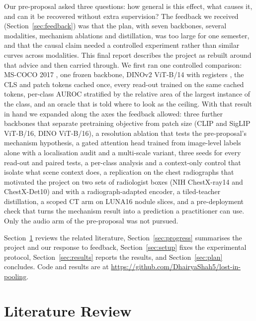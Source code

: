 \documentclass[10pt,letterpaper,twocolumn]{article}
\begin{document}
Our pre-proposal asked three questions: how general is this effect, what causes it, and can it
be recovered without extra supervision? The feedback we received (Section~\ref{sec:feedback})
was that the plan, with seven backbones, several modalities, mechanism ablations and
distillation, was too large for one semester, and that the causal claim needed a controlled
experiment rather than similar curves across modalities. This final report describes the
project as rebuilt around that advice and then carried through. We first ran one controlled
comparison: MS-COCO 2017
\citep{lin2014coco}, one frozen backbone, DINOv2 ViT-B/14 with registers
\citep{oquab2024dinov2,darcet2024registers}, the CLS and patch tokens cached once, every
read-out trained on the same cached tokens, per-class AUROC stratified by the relative area of
the largest instance of the class, and an oracle that is told where to look as the ceiling.
With that result in hand we expanded along the axes the feedback allowed: three further
backbones that separate pretraining objective from patch size (CLIP and SigLIP ViT-B/16, DINO
ViT-B/16), a resolution ablation that tests the pre-proposal's mechanism hypothesis, a gated
attention head trained from image-level labels alone with a localisation audit and a
multi-scale variant, three seeds for every read-out and paired tests, a per-class analysis
and a context-only control that isolate what scene context does, a replication on the chest
radiographs that motivated the project on two sets of radiologist boxes (NIH ChestX-ray14 and
ChestX-Det10) and with a radiograph-adapted encoder, a tiled-teacher distillation, a scoped
CT arm on LUNA16 nodule slices, and a pre-deployment check that turns the mechanism result
into a prediction a practitioner can use. Only the audio arm of the pre-proposal was not
pursued.

Section~\ref{sec:lit} reviews the related literature, Section~\ref{sec:progress} summarises
the project and our response to feedback, Section~\ref{sec:setup} fixes the experimental
protocol, Section~\ref{sec:results} reports the results, and Section~\ref{sec:plan}
concludes. Code and results are at
\url{https://github.com/DhairyaShah5/lost-in-pooling}.

\section{Literature Review}
\label{sec:lit}
\end{document}
